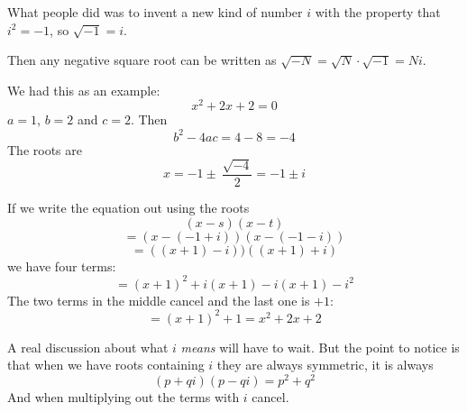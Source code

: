 \documentclass[11pt, oneside]{article}
\begin{document}
What people did was to invent a new kind of number $i$ with the property that $i^2 = -1$, so $\sqrt{-1} = i$.

Then any negative square root can be written as $\sqrt{-N} = \sqrt{N} \cdot \sqrt{-1} = Ni$.

We had this as an example:  
\[ x^2 + 2x + 2 = 0 \]
$a = 1$, $b = 2$ and $c = 2$.  Then
\[ b^2 - 4ac = 4 - 8 = -4 \]
The roots are
\[ x = -1 \pm \ \frac{\sqrt{-4}}{2} = -1 \pm i \]

If we write the equation out using the roots
\[ (x - s)(x - t) \]
\[ = (x - (- 1 + i))(x - (-1 - i)) \]
\[ = ((x + 1) - i))((x + 1) + i) \]
we have four terms:
\[ = (x + 1)^2 + i (x+1) - i (x+1) - i^2 \]
The two terms in the middle cancel and the last one is $+1$:
\[ = (x + 1)^2 + 1 = x^2 + 2x + 2 \]

A real discussion about what $i$ \emph{means} will have to wait.  But the point to notice is that when we have roots containing $i$ they are always symmetric, it is always
\[ (p + qi)(p - qi) = p^2 + q^2 \]
And when multiplying out the terms with $i$ cancel.
\end{document}
